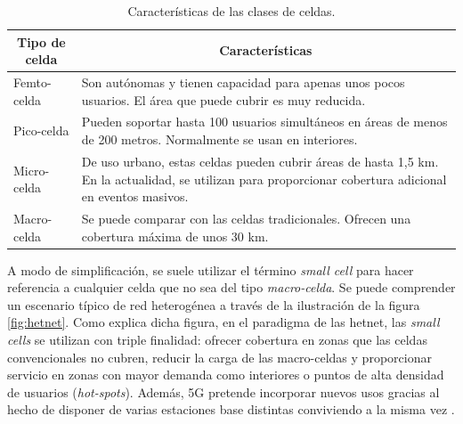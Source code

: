 \begin{table}[ht]
\centering
\caption{Características de las clases de celdas.}
\label{tab:celdas}
\begin{tabular}{m{3cm} m{9cm}}
\hline
\multicolumn{1}{c}{\textbf{Tipo de celda}} & \multicolumn{1}{c}{\textbf{Características}}                                                                                                             \\ \hline
Femto-celda                                & Son autónomas y tienen capacidad para apenas unos pocos usuarios. El área que puede cubrir es muy reducida.                                              \\ \hline
Pico-celda                                 & Pueden soportar hasta 100 usuarios simultáneos en áreas de menos de 200 metros. Normalmente se usan en interiores.                                       \\ \hline
Micro-celda                                & De uso urbano, estas celdas pueden cubrir áreas de hasta 1,5 km. En la actualidad, se utilizan para proporcionar cobertura adicional en eventos masivos. \\ \hline
Macro-celda                                & Se puede comparar con las celdas tradicionales. Ofrecen una cobertura máxima de unos 30 km.                                                              \\ \hline
\end{tabular}
\end{table}


A modo de simplificación, se suele utilizar el término \textit{small cell} para hacer referencia a cualquier celda que no sea del tipo \textit{macro-celda}. Se puede comprender un escenario típico de red heterogénea a través de la ilustración de la figura \ref{fig:hetnet}. Como explica dicha figura, en el paradigma de las \acs{hetnet}, las \textit{small cells} se utilizan con triple finalidad: ofrecer cobertura en zonas que las celdas convencionales no cubren, reducir la carga de las macro-celdas y proporcionar servicio en zonas con mayor demanda como interiores o puntos de alta densidad de usuarios (\textit{hot-spots}). Además, 5G pretende incorporar nuevos usos gracias al hecho de disponer de varias estaciones base distintas conviviendo a la misma vez \cite{hetnetexplained}. 

